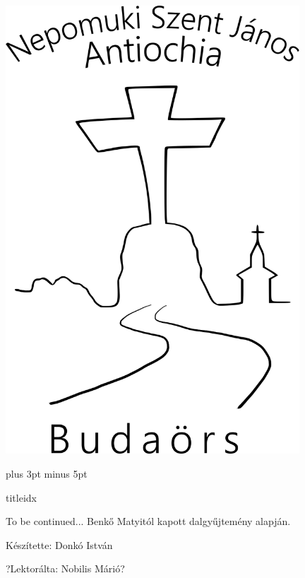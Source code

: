 \documentclass[a5paper,twoside]{article}
\author{Benkő Matyi - Donkó István}
\begin{document}
  \begin{titlepage}
    \setlength{\oddsidemargin}{-1.3cm}

    \vspace*{0.75cm}
    \includegraphics[width=11cm]{Logo_07_final}
  \end{titlepage}



  \versesep=12pt plus 3pt minus 5pt

  \begin{songs}{titleidx}
    
  \end{songs}

  To be continued...
  \vfill
  Benkő Matyitól kapott dalgyűjtemény alapján.

  Készítette: Donkó István

  ?Lektorálta: Nobilis Márió?
\end{document}
